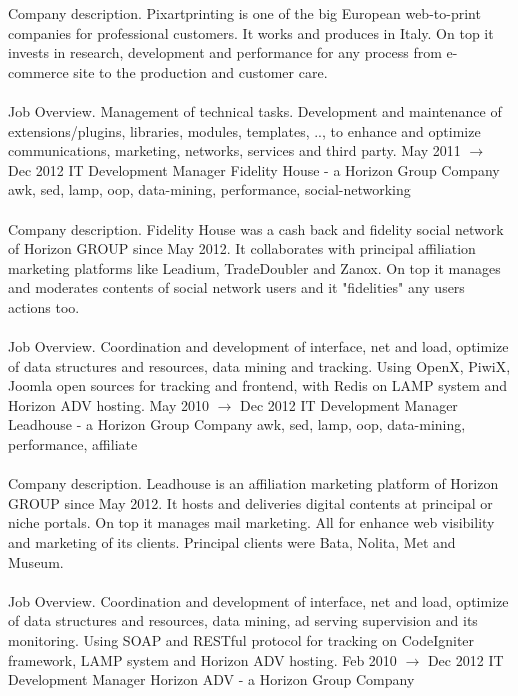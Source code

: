 \documentclass[9pt]{stackoverflow} %
\begin{document}
\begin{tcolorbox}
{\begin{entrylist}
{		Company description. Pixartprinting is one of the big European web-to-print companies for professional customers. It works
		and produces in Italy. On top it invests in research, development and performance for any process from e-commerce site to
		the production and customer care.\\\\
		Job Overview. Management of technical tasks. Development and maintenance of extensions/plugins, libraries, modules,
		templates, .., to enhance and optimize communications, marketing, networks, services and third party.}
	\entry
		{May 2011 $\rightarrow$ Dec 2012}
		{IT Development Manager}
		{Fidelity House - a Horizon Group Company}
		{{awk, sed, lamp, oop, data-mining, performance, social-networking}\\\\
		Company description. Fidelity House was a cash back and fidelity social network of Horizon GROUP since May 2012. It
		collaborates with principal affiliation marketing platforms like Leadium, TradeDoubler and Zanox. On top it manages and
		moderates contents of social network users and it "fidelities" any users actions too.\\\\
		Job Overview. Coordination and development of interface, net and load, optimize of data structures and resources, data mining and tracking.
		Using OpenX, PiwiX, Joomla open sources for tracking and frontend, with Redis on LAMP system and Horizon ADV hosting.}
	\entry
		{May 2010 $\rightarrow$ Dec 2012}
		{IT Development Manager}
		{Leadhouse - a Horizon Group Company}
		{{awk, sed, lamp, oop, data-mining, performance, affiliate}\\\\
		Company description. Leadhouse is an affiliation marketing platform of Horizon GROUP since May 2012. It hosts and
		deliveries digital contents at principal or niche portals. On top it manages mail marketing. All for enhance web visibility and
		marketing of its clients. Principal clients were Bata, Nolita, Met and Museum.\\\\
		Job Overview. Coordination and development of interface, net and load, optimize of data structures and resources, data
		mining, ad serving supervision and its monitoring. Using SOAP and RESTful protocol for tracking on CodeIgniter framework,
		LAMP system and Horizon ADV hosting.}
	\entry
		{Feb 2010 $\rightarrow$ Dec 2012}
		{IT Development Manager}
		{Horizon ADV - a Horizon Group Company}

\end{entrylist}}
\end{tcolorbox}
\end{document}
